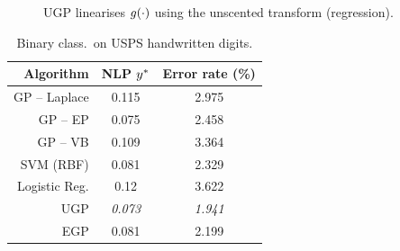\documentclass{beamer}
\begin{document}
\begin{frame}
\begin{columns}
\begin{column}{0.55\linewidth}
\begin{figure}
    \caption{UGP linearises $g\!\left({{\cdot}}\right)$ using the unscented transform
        (regression).}

\end{figure}

\vspace{-1.1cm}

\begin{table}[tb]
    \centering
    \caption[]{Binary class.\ on USPS handwritten digits.}
    \tiny
    \vspace{-3mm}
    \begin{tabular}{r| c c}
    Algorithm & NLP $y^{*}$ & Error rate (\%) \\
    \toprule
    GP -- Laplace & 0.115& 2.975 \\
    GP -- EP & 0.075& 2.458 \\
    GP -- VB & 0.109 & 3.364 \\ 
    SVM (RBF) & 0.081 & 2.329 \\
    Logistic Reg. & 0.12 & 3.622 \\
    \midrule
    UGP & \emph{0.073} & \emph{1.941} \\
    EGP & 0.081 & 2.199 \\
    \bottomrule
    \end{tabular}
    \label{tab:class}
\end{table}

\end{column}


\end{columns}

\end{frame}
\end{document}
